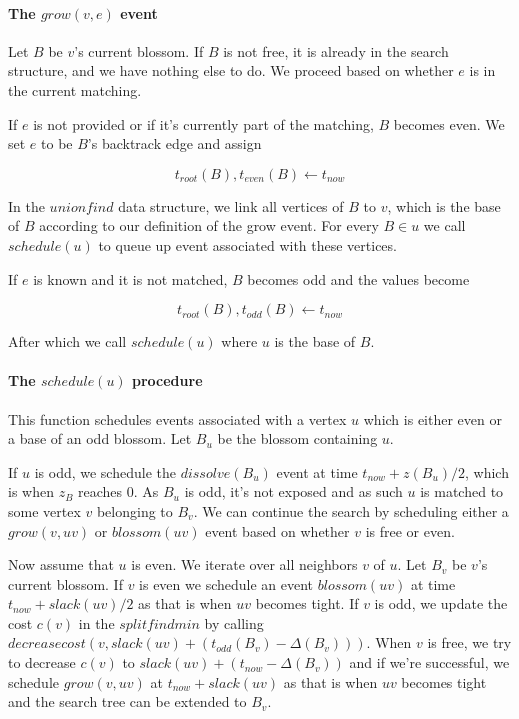 \paragraph*{The $grow(v, e)$ event}

Let $B$ be $v$'s current blossom. If $B$ is not free, it is already in the search structure, and we have nothing else to do. We proceed based on whether $e$ is in the current matching.

If $e$ is not provided or if it's currently part of the matching, $B$ becomes even. We set $e$ to be $B$'s backtrack edge and assign

\[ t_{root}(B), t_{even}(B) \gets t_{now} \]

In the $unionfind$ data structure, we link all vertices of $B$ to $v$, which is the base of $B$ according to our definition of the grow event. For every $B \in u$ we call $schedule(u)$ to queue up event associated with these vertices.

If $e$ is known and it is not matched, $B$ becomes odd and the values become

\[ t_{root}(B), t_{odd}(B) \gets t_{now} \]

After which we call $schedule(u)$ where $u$ is the base of $B$. 

\paragraph*{The $schedule(u)$ procedure}

This function schedules events associated with a vertex $u$ which is either even or a base of an odd blossom. Let $B_u$ be the blossom containing $u$. 

If $u$ is odd, we schedule the $dissolve(B_u)$ event at time $t_{now} + z(B_u) / 2$, which is when $z_B$ reaches $0$. As $B_u$ is odd, it's not exposed and as such $u$ is matched to some vertex $v$ belonging to $B_v$. We can continue the search by scheduling either a $grow(v, uv)$ or $blossom(uv)$ event based on whether $v$ is free or even.

Now assume that $u$ is even. We iterate over all neighbors $v$ of $u$. Let $B_v$ be $v$'s current blossom. If $v$ is even we schedule an event $blossom(uv)$ at time $t_{now} + slack(uv)/2$ as that is when $uv$ becomes tight. If $v$ is odd, we update the cost $c(v)$ in the $splitfindmin$ by calling $decreasecost(v, slack(uv) + (t_{odd}(B_v) - \Delta(B_v)))$. When $v$ is free, we try to decrease $c(v)$ to $slack(uv) + (t_{now} - \Delta(B_v))$ and if we're successful, we schedule $grow(v, uv)$ at $t_{now} + slack(uv)$ as that is when $uv$ becomes tight and the search tree can be extended to $B_v$.

